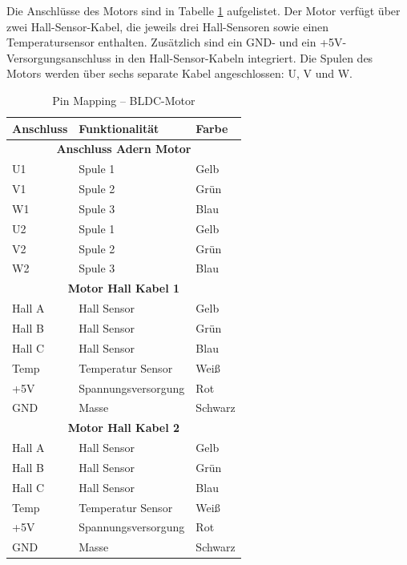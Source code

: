 Die Anschlüsse des Motors sind in Tabelle \ref{BLDC_Motor:tab:pinmapping} aufgelistet. Der Motor verfügt über zwei Hall-Sensor-Kabel, die jeweils drei Hall-Sensoren sowie einen Temperatursensor enthalten. Zusätzlich sind ein GND- und ein +5V-Versorgungsanschluss in den Hall-Sensor-Kabeln integriert. Die Spulen des Motors werden über sechs separate Kabel angeschlossen: U, V und W.
\pagebreak[1]
\begin{table}[!ht]
	\centering
	\caption{Pin Mapping – BLDC-Motor}
	\label{BLDC_Motor:tab:pinmapping}
	\begin{tabular}{lll}
		\hline
		\textbf{Anschluss}          & \textbf{Funktionalität} & \textbf{Farbe} \\ \hline
		\multicolumn{3}{c}{\textbf{Anschluss Adern Motor}}                     \\ \hline
		\multicolumn{1}{l|}{U1}     & Spule 1                 & Gelb           \\
		\multicolumn{1}{l|}{V1}     & Spule 2                 & Grün           \\
		\multicolumn{1}{l|}{W1}     & Spule 3                 & Blau           \\
		\multicolumn{1}{l|}{U2}     & Spule 1                 & Gelb           \\
		\multicolumn{1}{l|}{V2}     & Spule 2                 & Grün           \\
		\multicolumn{1}{l|}{W2}     & Spule 3                 & Blau           \\ \hline
		\multicolumn{3}{c}{\textbf{Motor Hall Kabel 1}}                        \\ \hline
		\multicolumn{1}{l|}{Hall A} & Hall Sensor             & Gelb           \\
		\multicolumn{1}{l|}{Hall B} & Hall Sensor             & Grün           \\
		\multicolumn{1}{l|}{Hall C} & Hall Sensor             & Blau           \\
		\multicolumn{1}{l|}{Temp}   & Temperatur Sensor       & Weiß           \\
		\multicolumn{1}{l|}{+5V}    & Spannungsversorgung     & Rot            \\
		\multicolumn{1}{l|}{GND}    & Masse                   & Schwarz        \\ \hline
		\multicolumn{3}{c}{\textbf{Motor Hall Kabel 2}}                        \\ \hline
		\multicolumn{1}{l|}{Hall A} & Hall Sensor             & Gelb           \\
		\multicolumn{1}{l|}{Hall B} & Hall Sensor             & Grün           \\
		\multicolumn{1}{l|}{Hall C} & Hall Sensor             & Blau           \\
		\multicolumn{1}{l|}{Temp}   & Temperatur Sensor       & Weiß           \\
		\multicolumn{1}{l|}{+5V}    & Spannungsversorgung     & Rot            \\
		\multicolumn{1}{l|}{GND}    & Masse                   & Schwarz        \\ \hline
	\end{tabular}
\end{table}
